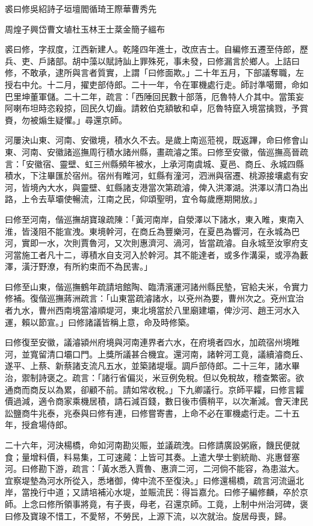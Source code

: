 
\begin{pinyinscope}
裘曰修吳紹詩子垣壇閻循琦王際華曹秀先

周煌子興岱曹文埴杜玉林王士棻金簡子縕布

裘曰修，字叔度，江西新建人。乾隆四年進士，改庶吉士。自編修五遷至侍郎，歷兵、吏、戶諸部。胡中藻以賦詩訕上罪殊死，事未發，曰修漏言於鄉人。上詰曰修，不敢承，逮所與言者質實，上謂「曰修面欺。」二十年五月，下部議奪職，左授右中允。十二月，擢吏部侍郎。二十一年，令在軍機處行走。師討準噶爾，命如巴里坤董軍儲。二十二年，疏言：「西陲回民數十部落，厄魯特人介其中。當策妄阿喇布坦時恣殺掠，回民久切齒。請敕伯克額敏和卓，厄魯特竄入境當擒戮，予賞賚，勿被煽生疑懼。」尋還京師。

河屢決山東、河南、安徽境，積水久不去。是歲上南巡蒞視，既返蹕，命曰修會山東、河南、安徽諸巡撫周行積水諸州縣，畫疏濬之策。曰修至安徽，偕巡撫高晉疏言：「安徽宿、靈壁、虹三州縣頻年被水，上承河南虞城、夏邑、商丘、永城四縣積水，下注畢匯於宿州。宿州有睢河，虹縣有潼河，泗洲與宿遷、桃源接壤處有安河，皆境內大水，與靈壁、虹縣諸支港當次第疏濬，俾入洪澤湖。洪澤以清口為出路，上令去草壩使暢流，江南之民，仰頌聖明，宜令每歲應期開放。」

曰修至河南，偕巡撫胡寶瑔疏陳：「黃河南岸，自滎澤以下諸水，東入睢，東南入淮，皆淺阻不能宣洩。東境幹河，在商丘為豐樂河，在夏邑為響河，在永城為巴河，實即一水，次則賈魯河，又次則惠濟河、渦河，皆當疏濬。自永城至汝寧府支河當施工者凡十二，導積水自支河入於幹河。其不能達者，或多作溝渠，或渟為藪澤，潢汙野潦，有所約束而不為民害。」

曰修至山東，偕巡撫鶴年疏請培館陶、臨清濱運河諸州縣民墊，官給夫米，令實力修補。復偕巡撫蔣洲疏言：「山東當疏濬諸水，以兗州為要，曹州次之。兗州宜治者九水，曹州西南境當濬順堤河，東北境當於八里廟建壩，俾沙河、趙王河水入運，賴以節宣。」曰修諸議皆稱上意，命及時修築。

曰修復至安徽，議濬潁州府境與河南連界者六水，在府境者四水，加疏宿州境睢河，並寬留清口壩口門。上獎所議甚合機宜。還河南，諸幹河工竟，議續濬商丘、遂平、上蔡、新蔡諸支流凡五水，並築諸堤堰。調戶部侍郎。二十三年，諸水畢治，禦制詩褒之。疏言：「諸行省偏災，米豆例免稅。但以免稅故，稽查繁密。欲通商而商反以為累，卻顧不前。請如常收稅。」下九卿議行。京師平糶，曰修言糶價過減，適令商家乘機居積，請石減百錢，數日後市價稍平，以次漸減。會天津民訟鹽商牛兆泰，兆泰與曰修有連，曰修嘗寄書，上命不必在軍機處行走。二十五年，授倉場侍郎。

二十六年，河決楊橋，命如河南勘災賑，並議疏洩。曰修請廣設粥廠，饑民便就食；量增料價，料易集，工可速蕆：上皆可其奏。上遣大學士劉統勛、兆惠督塞河。曰修勘下游，疏言：「黃水悉入賈魯、惠濟二河，二河倘不能容，為患滋大。宜察堤墊為河水所從入，悉堵御，俾中流不至復決。」曰修還楊橋，疏言河流逼北岸，當挽行中道；又請培補沁水堤，並賑流民：得旨嘉允。曰修子編修麟，卒於京師。上念曰修所領事將竟，有子喪，母老，召還京師。工竟，上制中州治河碑，褒曰修及寶瑔不惜工，不愛帑，不勞民，上源下流，以次就治。旋居母喪，歸。


\end{pinyinscope}
